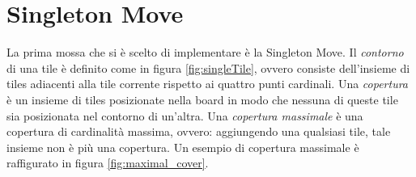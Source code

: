 \section{Singleton Move} %
\label{sec:singleton_move}

    La prima mossa che si è scelto di implementare è la Singleton Move. Il \textit{contorno} di una tile è definito come in figura \ref{fig:singleTile}, ovvero consiste dell'insieme di tiles adiacenti alla tile corrente rispetto ai quattro punti cardinali. Una \textit{copertura} è un insieme di tiles posizionate nella board in modo che nessuna di queste tile sia posizionata nel contorno di un'altra. Una \textit{copertura massimale} è una copertura di cardinalità massima, ovvero: aggiungendo una qualsiasi tile, tale insieme non è più una copertura. Un esempio di copertura massimale è raffigurato in figura \ref{fig:maximal_cover}.

